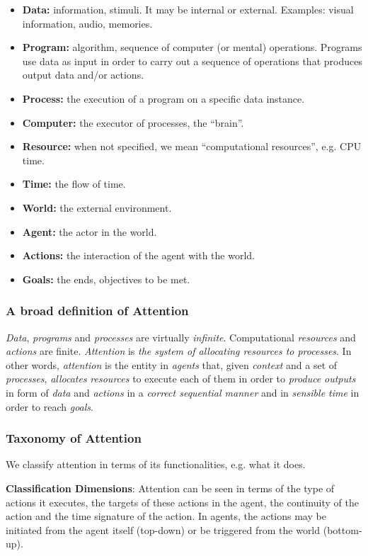 \documentclass[12pt]{article}
\begin{document}
\begin{itemize}
    \item\textbf{Data:} information, stimuli. It may be internal or external. Examples: visual information, audio, memories.
    \item\textbf{Program:} algorithm, sequence of computer (or mental) operations. Programs use data as input in order to carry out a sequence of operations that produces output data and/or actions.
    \item\textbf{Process:} the execution of a program on a specific data instance.
    \item\textbf{Computer:} the executor of processes, the “brain”.
    \item\textbf{Resource:} when not specified, we mean “computational resources”, e.g. CPU time.
    \item\textbf{Time:} the flow of time.
    \item\textbf{World:} the external environment.
    \item\textbf{Agent:} the actor in the world.
    \item\textbf{Actions:} the interaction of the agent with the world.
    \item\textbf{Goals:} the ends, objectives to be met.
\end{itemize}

\subsubsection{A broad definition of Attention}
\emph{Data}, \emph{programs} and \emph{processes} are virtually \emph{infinite}.
Computational \emph{resources} and \emph{actions} are finite.
\emph{Attention} is \emph{the system of allocating resources to processes}.
In other words, \emph{attention} is the entity in \emph{agents} that, given \emph{context} and a set of \emph{processes},
\emph{allocates} \emph{resources} to execute each of them in order to \emph{produce} \emph{outputs} in form of \emph{data} and \emph{actions} in a \emph{correct sequential manner} and in \emph{sensible time} in order to reach \emph{goals}.


\subsubsection{Taxonomy of Attention}
We classify attention in terms of its functionalities, e.g. what it does.

\textbf{Classification Dimensions}: Attention can be seen in terms of the type of actions it executes,
the targets of these actions in the agent, the continuity of the action and the time signature of the action.
In agents, the actions may be initiated from the agent itself (top-down) or be triggered from the world (bottom-up).
\end{document}
